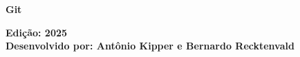 \begin{titlepage}
\setmainfont{Lato}
\ColocarImagemCapa


    \begin{center}
        \begin{minipage}[c]{0.62\textwidth}
        \centering
            \vspace{275pt}
            \begin{huge}
            
            \textbf{Git} \\
            \end{huge}
            \textbf{Edição: 2025} \\
            \textbf{Desenvolvido por: Antônio Kipper e Bernardo Recktenvald}
            \vfill
        \end{minipage}
    \end{center}

    \newpage
    \ColocarImagemSumario
    \tableofcontents  %
    \ColocarImagemSumario
    \thispagestyle{empty} %
    \newpage

\end{titlepage}